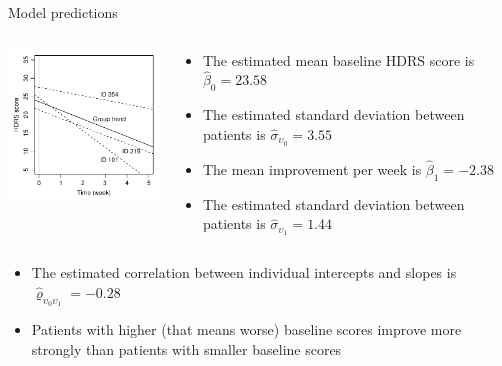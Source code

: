 \documentclass[aspectratio=169]{beamer}
\begin{document}
\begin{frame}{Model predictions}
\begin{columns}
  \begin{column}{.4\textwidth}
    \includegraphics[width=5cm]{../figures/hdrs-lme2}
  \end{column}
  \begin{column}{.6\textwidth}
    \begin{itemize}
      \item The estimated mean baseline HDRS score is $\hat{\beta}_0 = 23.58$
      \item The estimated standard deviation between patients is
        $\hat{\sigma}_{\upsilon_0} = 3.55$
      \item The mean improvement per week is $\hat{\beta}_1 = -2.38$
      \item The estimated standard deviation between patients is
        $\hat{\sigma}_{\upsilon_1} = 1.44$
    \end{itemize}
  \end{column}
\end{columns}
  \begin{itemize}
    \item The estimated correlation between individual intercepts and
      slopes is $\hat{\varrho}_{\upsilon_0 \upsilon_1} = -0.28$
    \item Patients with higher (that means worse) baseline scores improve
      more strongly than patients with smaller baseline scores
  \end{itemize}
\end{frame}
\end{document}
